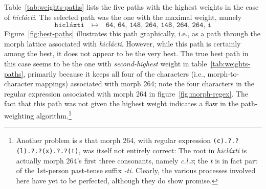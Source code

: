 {Table~\ref{tab:weights-paths} lists the five paths with the highest weights in the case of \textit{hicl\'{a}cti}. The selected path was the one with the maximal weight, namely
\begin{equation}\label{eq:best-path} 
\texttt{hicl\'{a}xti} \quad \mapsto \quad \texttt{64, 64, 148, 264, 148, 264, 264, i}
\end{equation}
Figure~\ref{fig:best-paths} illustrates this path graphically, i.e., as a path through the morph lattice associated with 
\textit{hicl\'{a}cti}.
However, while this path is certainly among the best, it does not appear to be the very best.  The true best path in this case seems to be the one with \textit{second-highest} weight in table~\ref{tab:weights-paths}, primarily because it keeps all four of the characters (i.e., morph-to-character mappings) associated with morph 264; %
note the four characters in the regular expression associated with morph 264 in figure~\ref{fig:morph-regex}. 
The fact that this path was not given the highest weight indicates a 
flaw in the path-weighting algorithm.\footnote{Another problem is  s
that morph 264, with regular expression \texttt{(c).?.?(l).?.?(x).?.?(t)}, was itself not entirely correct: The root in \textit{hicl\'{a}xti} is actually morph 264's first three consonants, namely \textit{c.l.x}; the \textit{t} is in fact part of the 1st-person past-tense suffix \textit{-ti}. Clearly, the various processes involved here have yet to be perfected, although they do show promise.}


}
